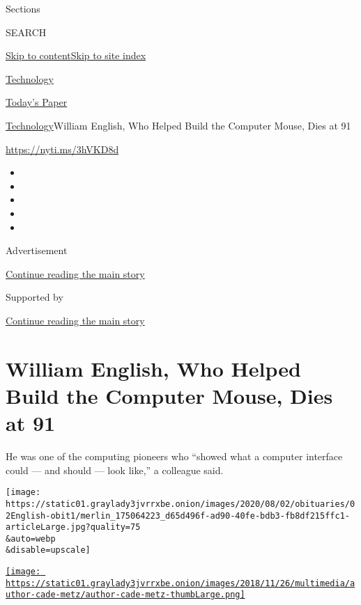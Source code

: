 Sections

SEARCH

\protect\hyperlink{site-content}{Skip to
content}\protect\hyperlink{site-index}{Skip to site index}

\href{https://www.nytimes3xbfgragh.onion/section/technology}{Technology}

\href{https://myaccount.nytimes3xbfgragh.onion/auth/login?response_type=cookie\&client_id=vi}{}

\href{https://www.nytimes3xbfgragh.onion/section/todayspaper}{Today's
Paper}

\href{/section/technology}{Technology}\textbar{}William English, Who
Helped Build the Computer Mouse, Dies at 91

\url{https://nyti.ms/3hVKD8d}

\begin{itemize}
\item
\item
\item
\item
\item
\end{itemize}

Advertisement

\protect\hyperlink{after-top}{Continue reading the main story}

Supported by

\protect\hyperlink{after-sponsor}{Continue reading the main story}

\hypertarget{william-english-who-helped-build-the-computer-mouse-dies-at-91}{%
\section{William English, Who Helped Build the Computer Mouse, Dies at
91}\label{william-english-who-helped-build-the-computer-mouse-dies-at-91}}

He was one of the computing pioneers who ``showed what a computer
interface could --- and should --- look like,'' a colleague said.

\texttt{[image: https://static01.graylady3jvrrxbe.onion/images/2020/08/02/obituaries/02English-obit1/merlin\_175064223\_d65d496f-ad90-40fe-bdb3-fb8df215ffc1-articleLarge.jpg?quality=75\\\&auto=webp\\\&disable=upscale]}

\href{https://www.nytimes3xbfgragh.onion/by/cade-metz}{\texttt{[image: https://static01.graylady3jvrrxbe.onion/images/2018/11/26/multimedia/author-cade-metz/author-cade-metz-thumbLarge.png]}}


